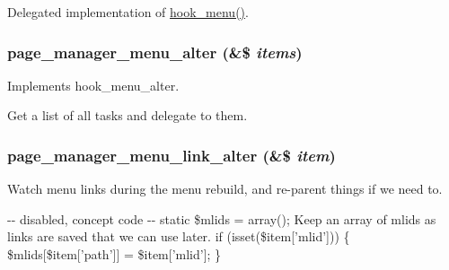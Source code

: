 \label{page__manager_8module_a64d2119bb7c032cf8d11b0431a7b4bc0}
Delegated implementation of \hyperlink{group__hooks_ga5c95244fea59b25666e409759e133ded}{hook\_\-menu()}. \hypertarget{page__manager_8module_a16da3e1f83cf82d7d13d81847206f135}{
\subsubsection[{page\_\-manager\_\-menu\_\-alter}]{\setlength{\rightskip}{0pt plus 5cm}page\_\-manager\_\-menu\_\-alter (\&\$ {\em items})}}
\label{page__manager_8module_a16da3e1f83cf82d7d13d81847206f135}
Implements hook\_\-menu\_\-alter.

Get a list of all tasks and delegate to them. \hypertarget{page__manager_8module_a75d9dfb39efb8b79e8c5771cb288fb2c}{
\subsubsection[{page\_\-manager\_\-menu\_\-link\_\-alter}]{\setlength{\rightskip}{0pt plus 5cm}page\_\-manager\_\-menu\_\-link\_\-alter (\&\$ {\em item})}}
\label{page__manager_8module_a75d9dfb39efb8b79e8c5771cb288fb2c}
Watch menu links during the menu rebuild, and re-\/parent things if we need to. 

-\/-\/ disabled, concept code -\/-\/ static \$mlids = array(); Keep an array of mlids as links are saved that we can use later. if (isset(\$item\mbox{[}'mlid'\mbox{]})) \{ \$mlids\mbox{[}\$item\mbox{[}'path'\mbox{]}\mbox{]} = \$item\mbox{[}'mlid'\mbox{]}; \}

